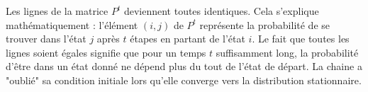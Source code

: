 Les lignes de la matrice $P^t$ deviennent toutes identiques. 
Cela s'explique mathématiquement : l'élément $(i,j)$ de $P^t$ représente la probabilité 
de se trouver dans l'état $j$ après $t$ étapes en partant de l'état $i$. Le fait que toutes 
les lignes soient égales signifie que pour un temps $t$ suffisamment long, la probabilité 
d'être dans un état donné ne dépend plus du tout de l'état de départ. La chaine a "oublié" 
sa condition initiale lors qu'elle converge vers la distribution stationnaire.